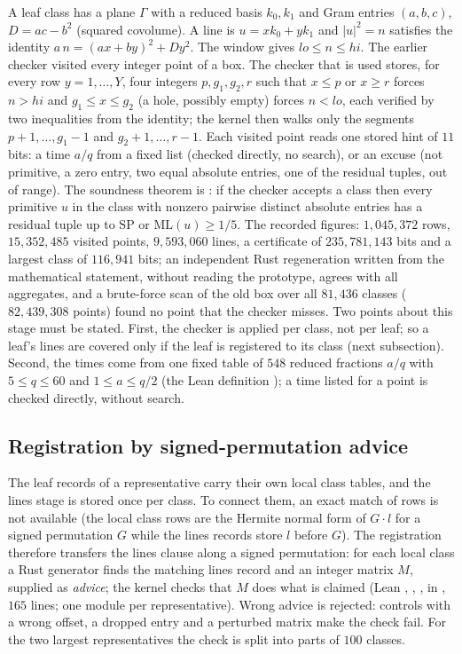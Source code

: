 \documentclass[11pt]{article}
\theoremstyle{remark}
\newcommand{\ML}{\mathrm{ML}}
\begin{document}
A leaf class has a plane $\Gamma$ with a reduced basis $k_0,k_1$ and Gram entries $(a,b,c)$, $D=ac-b^2$ (squared covolume). A line is $u=xk_0+yk_1$ and $|u|^2=n$ satisfies the identity $a\,n=(ax+by)^2+Dy^2$. The window gives $lo\le n\le hi$. The earlier checker visited every integer point of a box. The checker that is used stores, for every row $y=1,\dots,Y$, four integers $p,g_1,g_2,r$ such that $x\le p$ or $x\ge r$ forces $n>hi$ and $g_1\le x\le g_2$ (a hole, possibly empty) forces $n<lo$, each verified by two inequalities from the identity; the kernel then walks only the segments $p+1,\dots,g_1-1$ and $g_2+1,\dots,r-1$. Each visited point reads one stored hint of $11$ bits: a time $a/q$ from a fixed list (checked directly, no search), or an excuse (not primitive, a zero entry, two equal absolute entries, one of the residual tuples, out of range). The soundness theorem is : if the checker accepts a class then every primitive $u$ in the class with nonzero pairwise distinct absolute entries has a residual tuple up to $\mathrm{SP}$ or $\ML(u)\ge1/5$. The recorded figures: $1{,}045{,}372$ rows, $15{,}352{,}485$ visited points, $9{,}593{,}060$ lines, a certificate of $235{,}781{,}143$ bits and a largest class of $116{,}941$ bits; an independent Rust regeneration written from the mathematical statement, without reading the prototype, agrees with all aggregates, and a brute-force scan of the old box over all $81{,}436$ classes ($82{,}439{,}308$ points) found no point that the checker misses.
Two points about this stage must be stated. First, the checker is applied per class, not per leaf; so a leaf's lines are covered only if the leaf is registered to its class (next subsection). Second, the times come from one fixed table of $548$ reduced fractions $a/q$ with $5\le q\le60$ and $1\le a\le q/2$ (the Lean definition ); a time listed for a point is checked directly, without search.

\subsection{Registration by signed-permutation advice}\label{sec:reg}

The leaf records of a representative carry their own local class tables, and the lines stage is stored once per class. To connect them, an exact match of rows is not available (the local class rows are the Hermite normal form of $G\cdot l$ for a signed permutation $G$ while the lines records store $l$ before $G$). The registration therefore transfers the lines clause along a signed permutation: for each local class a Rust generator finds the matching lines record and an integer matrix $M$, supplied as \emph{advice}; the kernel checks that $M$ does what is claimed (Lean , , , in , $165$ lines; one  module per representative).
Wrong advice is rejected: controls with a wrong offset, a dropped entry and a perturbed matrix make the check fail. For the two largest representatives the check is split into parts of $100$ classes.
\end{document}
